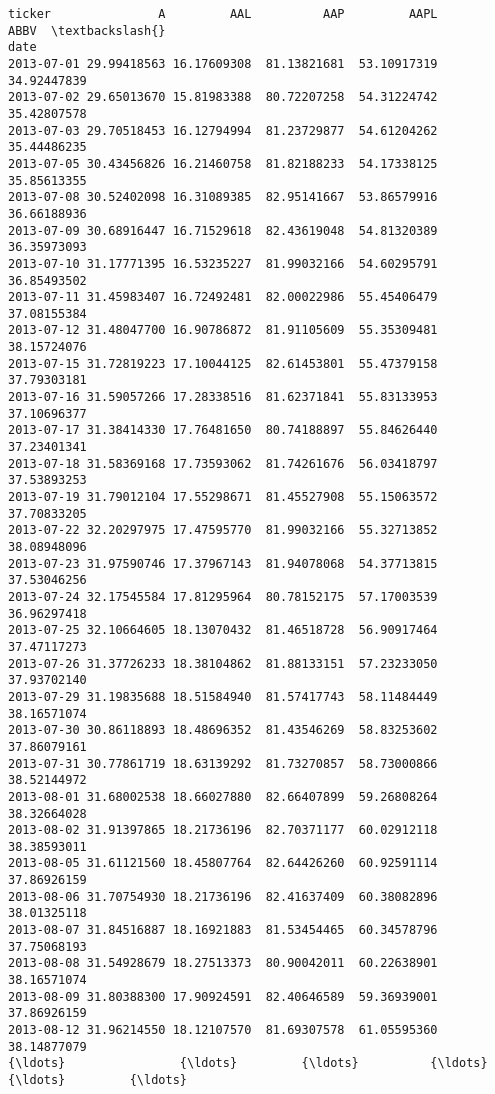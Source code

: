 \documentclass[11pt]{article}
\begin{document}
    \begin{Verbatim}[commandchars=\\\{\}]
ticker               A         AAL          AAP         AAPL        ABBV  \textbackslash{}
date                                                                       
2013-07-01 29.99418563 16.17609308  81.13821681  53.10917319 34.92447839   
2013-07-02 29.65013670 15.81983388  80.72207258  54.31224742 35.42807578   
2013-07-03 29.70518453 16.12794994  81.23729877  54.61204262 35.44486235   
2013-07-05 30.43456826 16.21460758  81.82188233  54.17338125 35.85613355   
2013-07-08 30.52402098 16.31089385  82.95141667  53.86579916 36.66188936   
2013-07-09 30.68916447 16.71529618  82.43619048  54.81320389 36.35973093   
2013-07-10 31.17771395 16.53235227  81.99032166  54.60295791 36.85493502   
2013-07-11 31.45983407 16.72492481  82.00022986  55.45406479 37.08155384   
2013-07-12 31.48047700 16.90786872  81.91105609  55.35309481 38.15724076   
2013-07-15 31.72819223 17.10044125  82.61453801  55.47379158 37.79303181   
2013-07-16 31.59057266 17.28338516  81.62371841  55.83133953 37.10696377   
2013-07-17 31.38414330 17.76481650  80.74188897  55.84626440 37.23401341   
2013-07-18 31.58369168 17.73593062  81.74261676  56.03418797 37.53893253   
2013-07-19 31.79012104 17.55298671  81.45527908  55.15063572 37.70833205   
2013-07-22 32.20297975 17.47595770  81.99032166  55.32713852 38.08948096   
2013-07-23 31.97590746 17.37967143  81.94078068  54.37713815 37.53046256   
2013-07-24 32.17545584 17.81295964  80.78152175  57.17003539 36.96297418   
2013-07-25 32.10664605 18.13070432  81.46518728  56.90917464 37.47117273   
2013-07-26 31.37726233 18.38104862  81.88133151  57.23233050 37.93702140   
2013-07-29 31.19835688 18.51584940  81.57417743  58.11484449 38.16571074   
2013-07-30 30.86118893 18.48696352  81.43546269  58.83253602 37.86079161   
2013-07-31 30.77861719 18.63139292  81.73270857  58.73000866 38.52144972   
2013-08-01 31.68002538 18.66027880  82.66407899  59.26808264 38.32664028   
2013-08-02 31.91397865 18.21736196  82.70371177  60.02912118 38.38593011   
2013-08-05 31.61121560 18.45807764  82.64426260  60.92591114 37.86926159   
2013-08-06 31.70754930 18.21736196  82.41637409  60.38082896 38.01325118   
2013-08-07 31.84516887 18.16921883  81.53454465  60.34578796 37.75068193   
2013-08-08 31.54928679 18.27513373  80.90042011  60.22638901 38.16571074   
2013-08-09 31.80388300 17.90924591  82.40646589  59.36939001 37.86926159   
2013-08-12 31.96214550 18.12107570  81.69307578  61.05595360 38.14877079   
{\ldots}                {\ldots}         {\ldots}          {\ldots}          {\ldots}         {\ldots}   

\end{Verbatim}
\end{document}
